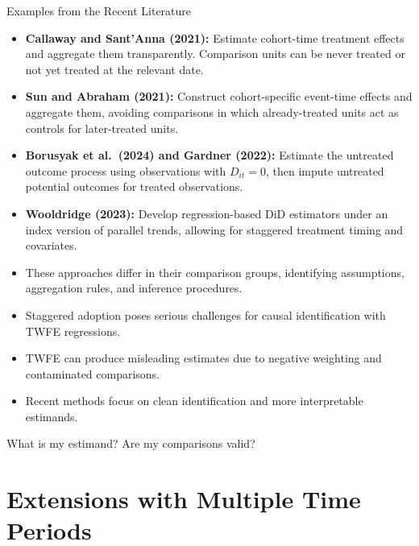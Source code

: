 \documentclass[11pt,aspectratio=169]{beamer}
\begin{document}
\begin{frame}{Examples from the Recent Literature}
\small
\begin{itemize}
  \item \textbf{Callaway and Sant'Anna (2021):} Estimate cohort-time treatment effects and aggregate them transparently. Comparison units can be never treated or not yet treated at the relevant date.
  \item \textbf{Sun and Abraham (2021):} Construct cohort-specific event-time effects and aggregate them, avoiding comparisons in which already-treated units act as controls for later-treated units.
  \item \textbf{Borusyak et al.\ (2024) and Gardner (2022):} Estimate the untreated outcome process using observations with $D_{it}=0$, then impute untreated potential outcomes for treated observations.
  \item \textbf{Wooldridge (2023):} Develop regression-based DiD estimators under an index version of parallel trends, allowing for staggered treatment timing and covariates.
  \item These approaches differ in their comparison groups, identifying assumptions, aggregation rules, and inference procedures.
\end{itemize}
\end{frame}

\begin{summaryframe}
\begin{itemize}
  \item Staggered adoption poses serious challenges for causal identification with TWFE regressions.
  \item TWFE can produce misleading estimates due to negative weighting and contaminated comparisons.
  \item Recent methods focus on clean identification and more interpretable estimands.
\end{itemize}
\begin{importantbox}
What is my estimand? Are my comparisons valid?
\end{importantbox}
\end{summaryframe}


\section{Extensions with Multiple Time Periods}
\end{document}

